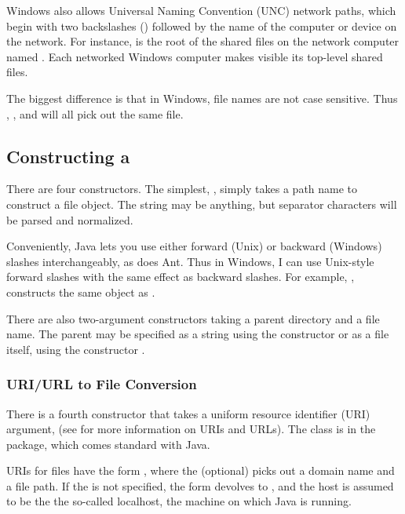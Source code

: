 Windows also allows Universal Naming Convention (UNC) network paths,
which begin with two backslashes (\code{\bk\bk}) followed by the name
of the computer or device on the network.  For instance,
 is the root of the shared files on the network
computer named
.  Each networked Windows computer makes visible its 
top-level shared files.  

The biggest difference is that in Windows, file names are not case
sensitive.  Thus , , and  will all pick
out the same file.  


\subsection{Constructing a }

There are four  constructors.  The simplest,
, simply takes a path name to construct
a file object.  The string may be anything, but separator characters
will be parsed and normalized.

Conveniently, Java lets you use either forward (Unix)
or backward (Windows) slashes interchangeably, as does Ant.  Thus in
Windows, I can use Unix-style forward slashes with the same effect as
backward slashes.  For example, , constructs
the same object as .  

There are also two-argument constructors taking a parent directory and
a file name.  The parent may be specified as a string using the constructor
 or as a file itself, using the constructor
.

\subsubsection{URI/URL to File Conversion}

There is a fourth  constructor that takes a uniform
resource identifier (URI) argument,  (see
 for more information on URIs and URLs).  The
 class is in the  package, which comes
standard with Java.

URIs for files have the form
\code{/}, where the
(optional)  picks out a domain name and  a
file path.  If the  is not specified, the form devolves
to , and the host is assumed to be the
the so-called localhost, the machine on which Java is running.

